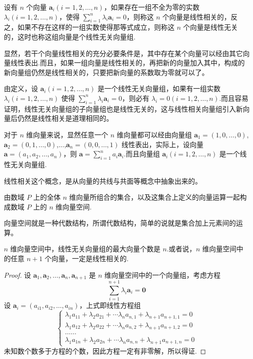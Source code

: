 \begin{definition}
  设有 $n$ 个向量 $\bm{a}_i (i = 1, 2, \ldots,
  n)$，如果存在一组不全为零的实数 $\lambda_i (i = 1, 2, \ldots,
  n)$，使得 $\sum_{i = 1}^n \lambda_i \bm{a}_i = 0$，则称这 $n$
  个向量是线性相关的，反之，如果不存在这样的一组实数使得那等式成立，则称这
  $n$
  个向量是线性无关的，这时也称这组向量是个线性无关向量组.
\end{definition}

显然，若干个向量线性相关的充分必要条件是，其中存在某个向量可以经由其它向量线性表出.而且，如果一组向量是线性相关的，再把新的向量加入其中，构成的新向量组仍然是线性相关的，只要把新向量的系数取为零就可以了。

由定义，设 $\bm{a}_i (i = 1, 2, \ldots, n)$
是一个线性无关向量组，如果有一组实数 $\lambda_i (i = 1, 2,
\ldots, n)$ 使得 $\sum_{i = 1}^n \lambda_i \bm{a}_i = 0$，则必有
$\lambda_i = 0 (i = 1, 2, \ldots,
n)$.而且容易证明，线性无关向量组的子向量组也是线性无关的，这与线性相关向量组引入新向量后仍然是线性相关是道理相同的。

\begin{example}
  对于 $n$ 维向量来说，显然任意一个 $n$
  维向量都可以经由向量组 $\bm{a}_1 = (1, 0, \ldots, 0)$,
  $\bm{a}_2 = (0, 1, \ldots, 0)$,...,$\bm{a}_n = (0, 0, \ldots,
  1)$ 线性表出，实际上，设向量 $\bm{a}= (a_1, a_2, \ldots,
  a_n)$，则 $\bm{a}= \sum_{i = 1}^n a_i
  \bm{a}_i$.而且向量组 $\bm{a}_i (i = 1, 2, \ldots, n)$
  是一个线性无关向量组.
\end{example}

线性相关这个概念，是从向量的共线与共面等概念中抽象出来的。

\begin{definition}
  由数域 $P$ 上的全体 $n$
  维向量所组合的集合，以及这集合上定义的向量运算一起构成数域
  $P$ 上的 $n$ 维向量空间.
\end{definition}

向量空间就是一种代数结构，所谓代数结构，简单的说就是集合加上元素间的运算。

\begin{theorem}
  $n$ 维向量空间中，线性无关向量组的最大向量个数是
  $n$.或者说，$n$ 维向量空间中的任意 $n + 1$
  个向量，一定是线性相关的.
\end{theorem}

\begin{proof}
  设 $\bm{a}_1, \bm{a}_2, \ldots, \bm{a}_n, \bm{a}_{n
  + 1}$ 是 $n$ 维向量空间中的一个向量组，考虑方程
  \[ \sum_{i = 1}^{n + 1} \lambda_i \bm{a}_i =\bm{0} \]
  设 $\bm{a}_i = (a_{i 1}, a_{i 2}, \ldots, a_{i
  n})$，上式即线性方程组
  \[ \left\{ \begin{array}{l}
       \lambda_1 a_{11} + \lambda_2 a_{21} + \cdots \lambda_n a_{n, 1} +
       \lambda_{n + 1} a_{n + 1, 1} = 0\\
       \lambda_1 a_{12} + \lambda_2 a_{22} + \cdots \lambda_n a_{n, 2} +
       \lambda_{n + 1} a_{n + 1, 2} = 0\\
       \ldots \ldots\\
       \lambda_1 a_{1 n} + \lambda_2 a_{2 n} + \cdots \lambda_n a_{n, n} +
       \lambda_{n + 1} a_{n + 1, n} = 0
     \end{array} \right. \]
  未知数个数多于方程的个数，因此方程一定有非零解，所以得证.
\end{proof}


